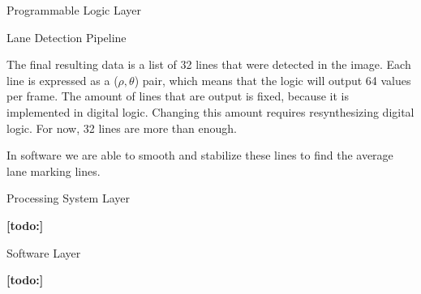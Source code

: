 \documentclass{matthijs}
\begin{document}
\begin{hoofdstuk}{Programmable Logic Layer}
\begin{paragraaf}{Lane Detection Pipeline}
			\bigskip

			The final resulting data is a list of 32 lines that were detected in the image.
			Each line is expressed as a ($ \rho, \theta $) pair, which means that the logic will output 64 values per frame.
			The amount of lines that are output is fixed, because it is implemented in digital logic.
			Changing this amount requires resynthesizing digital logic.
			For now, 32 lines are more than enough.

			In software we are able to smooth and stabilize these lines to find the average lane marking lines.

		\end{paragraaf}

	\end{hoofdstuk}

	\begin{hoofdstuk}{Processing System Layer}

		\textbf{[todo:]}

	\end{hoofdstuk}
	
	\begin{hoofdstuk}{Software Layer}

		\textbf{[todo:]}

	\end{hoofdstuk}
\end{document}
